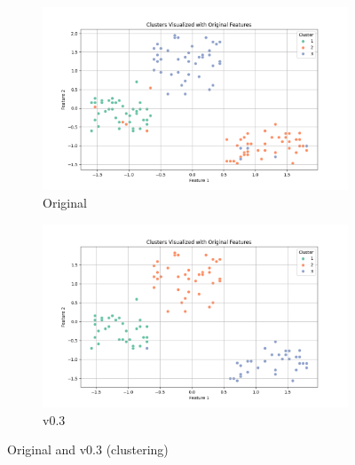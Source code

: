 \documentclass[a4paper,12pt]{article}
\begin{document}
\begin{figure}[H]
\centering
\begin{subfigure}{0.48\textwidth}
\includegraphics[width=\linewidth]{results_Cluster_og.png}
\caption{Original}
\end{subfigure}
\hfill
\begin{subfigure}{0.48\textwidth}
\includegraphics[width=\linewidth]{results_Cluster_v3.png}
\caption{v0.3}
\end{subfigure}
\caption{Original and v0.3 (clustering)}
\end{figure}
\end{document}
